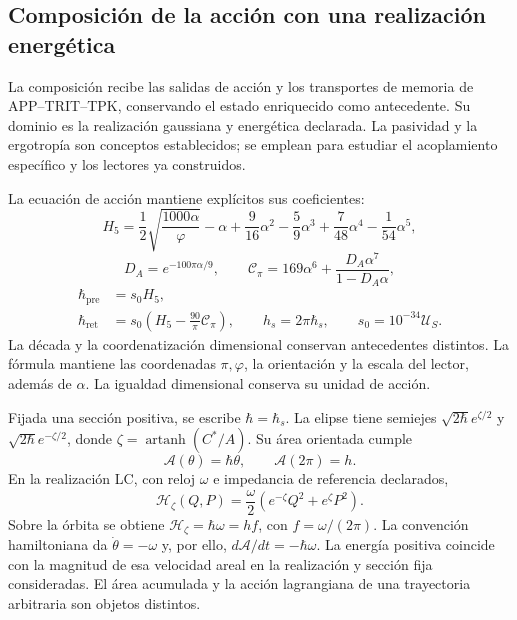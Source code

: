 \subsection{Composición de la acción con una realización energética}
\label{md:aux:accion}

La composición recibe las salidas de acción y los transportes
de memoria de APP--TRIT--TPK, conservando el estado enriquecido
como antecedente. Su dominio es la realización gaussiana y
energética declarada. La pasividad y la ergotropía son conceptos
establecidos; se emplean para estudiar el acoplamiento específico
y los lectores ya construidos.

La ecuación de acción mantiene explícitos sus coeficientes:
\begin{equation}
 H_5=\frac12\sqrt{\frac{1000\alpha}{\varphi}}-\alpha
 +\frac9{16}\alpha^2-\frac59\alpha^3
 +\frac7{48}\alpha^4-\frac1{54}\alpha^5,
 \label{md:aux:h5}
\end{equation}
\begin{equation}
 D_A=e^{-100\pi\alpha/9},\qquad
 \mathcal C_\pi=169\alpha^6+\frac{D_A\alpha^7}{1-D_A\alpha},
 \label{md:aux:correccion-accion}
\end{equation}
\begin{equation}
 \begin{aligned}
 \hbar_{\mathrm{pre}}&=s_0H_5,\\
 \hbar_{\mathrm{ret}}&=s_0\left(H_5-\frac{90}{\pi}\mathcal C_\pi\right),
 \qquad h_s=2\pi\hbar_s,\qquad s_0=10^{-34}\mathcal U_S.
 \end{aligned}
 \label{md:aux:secciones-accion}
\end{equation}
La década y la coordenatización dimensional conservan antecedentes
distintos. La fórmula mantiene las coordenadas $\pi,\varphi$,
la orientación y la escala del lector, además de $\alpha$.
La igualdad dimensional conserva su unidad de acción.

Fijada una sección positiva, se escribe $\hbar=\hbar_s$.
La elipse tiene semiejes $\sqrt{2\hbar}e^{\zeta/2}$ y
$\sqrt{2\hbar}e^{-\zeta/2}$, donde
$\zeta=\operatorname{artanh}(C^*/A)$. Su área orientada cumple
\begin{equation}
 \mathcal A(\theta)=\hbar\theta,\qquad
 \mathcal A(2\pi)=h.
 \label{md:aux:area-fase}
\end{equation}
En la realización LC, con reloj $\omega$ e impedancia de
referencia declarados,
\begin{equation}
 \mathcal H_\zeta(Q,P)
 =\frac\omega2\left(e^{-\zeta}Q^2+e^\zeta P^2\right).
 \label{md:aux:hamiltoniano-lc}
\end{equation}
Sobre la órbita se obtiene $\mathcal H_\zeta=\hbar\omega=hf$,
con $f=\omega/(2\pi)$. La convención hamiltoniana da
$\dot\theta=-\omega$ y, por ello,
$d\mathcal A/dt=-\hbar\omega$. La energía positiva coincide
con la magnitud de esa velocidad areal en la realización y
sección fija consideradas. El área acumulada y la acción
lagrangiana de una trayectoria arbitraria son objetos distintos.

